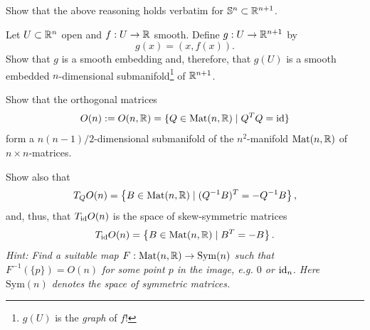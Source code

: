 \begin{exercise}
	Show that the above reasoning holds verbatim for $\mathbb{S}^n\subset\mathbb{R}^{n+1}$.
\end{exercise}

\begin{exercise}
	Let $U\subset\mathbb{R}^n$ open and $f:U\to\mathbb{R}$ smooth.
	Define $g:U\to\mathbb{R}^{n+1}$ by
	\begin{equation}
		g(x) = (x, f(x)).
	\end{equation}
	Show that $g$ is a smooth embedding and, therefore, that $g(U)$ is a smooth embedded $n$-dimensional submanifold\footnote{$g(U)$ is the \emph{graph} of $f$!} of $\mathbb{R}^{n+1}$.
\end{exercise}

\begin{exercise}\label{exe:onsubmanifold}
	Show that the orthogonal matrices
	\begin{equation}
		O(n) := O(n, \mathbb{R}) = \{ Q\in \mathrm{Mat}(n, \mathbb{R}) \mid Q^TQ=\operatorname{id} \}
	\end{equation}
	form a $n(n-1)/2$-dimensional submanifold of the $n^2$-manifold $\mathrm{Mat}(n, \mathbb{R})$ of $n\times n$-matrices.

	Show also that
	\begin{equation}
		T_Q O(n) = \left\lbrace B \in \mathrm{Mat}(n, \mathbb{R}) \mid (Q^{-1} B)^T = -Q^{-1}B \right\rbrace,
	\end{equation}
	and, thus, that $T_{\operatorname{id}} O(n)$ is the space of skew-symmetric matrices
	\begin{equation}
		T_{\operatorname{id}} O(n) = \left\{ B \in \mathrm{Mat}(n, \mathbb{R}) \mid B^T = -B \right\}.
	\end{equation}
	\textit{\small Hint: Find a suitable map $F: \mathrm{Mat}(n, \mathbb{R}) \to \mathrm{Sym}(n)$ such that $F^{-1}(\{p\}) = O(n)$ for some point $p$ in the image, e.g. $0$ or $\operatorname{id}_n$.
		Here $\mathrm{Sym}(n)$ denotes the space of symmetric matrices.}
\end{exercise}
